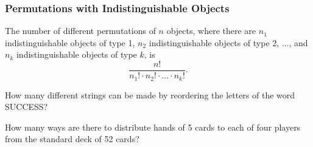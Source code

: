 \subsubsection{Permutations with Indistinguishable Objects}

\begin{thm}
The number of different permutations of $n$ objects, where there are $n_1$ indistinguishable objects of type 1, $n_2$ indistinguishable objects of type 2, ..., and $n_k$ indistinguishable objects of type $k$, is
\[
\frac{n!}{n_1! \cdot n_2! \cdot \ldots \cdot n_k!}.
\]

\end{thm}

\begin{exmp}
How many different strings can be made by reordering the letters of the word SUCCESS?\vspace{3cm}
\end{exmp}


\begin{exmp}
How many ways are there to distribute hands of 5 cards to each of four players from the standard
deck of 52 cards?
\end{exmp}
